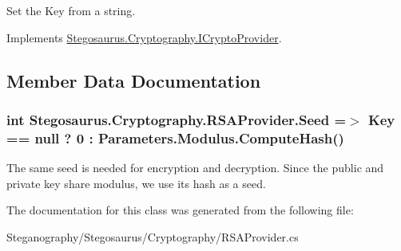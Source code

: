 Set the Key from a string. 



Implements \hyperlink{interface_stegosaurus_1_1_cryptography_1_1_i_crypto_provider_a95c1bb37e8bfdb62e6f66e8094d9d51b}{Stegosaurus.\+Cryptography.\+I\+Crypto\+Provider}.



\subsection{Member Data Documentation}
\subsubsection[{\texorpdfstring{Seed}{Seed}}]{\setlength{\rightskip}{0pt plus 5cm}int Stegosaurus.\+Cryptography.\+R\+S\+A\+Provider.\+Seed =$>$ Key == null ? 0 \+: Parameters.\+Modulus.\+Compute\+Hash()}\hypertarget{class_stegosaurus_1_1_cryptography_1_1_r_s_a_provider_af73cf9dd65178ff5574b08072ea1a6c3}{}\label{class_stegosaurus_1_1_cryptography_1_1_r_s_a_provider_af73cf9dd65178ff5574b08072ea1a6c3}


The same seed is needed for encryption and decryption. Since the public and private key share modulus, we use its hash as a seed. 



The documentation for this class was generated from the following file\+:\begin{DoxyCompactItemize}
\item 
Steganography/\+Stegosaurus/\+Cryptography/R\+S\+A\+Provider.\+cs\end{DoxyCompactItemize}
